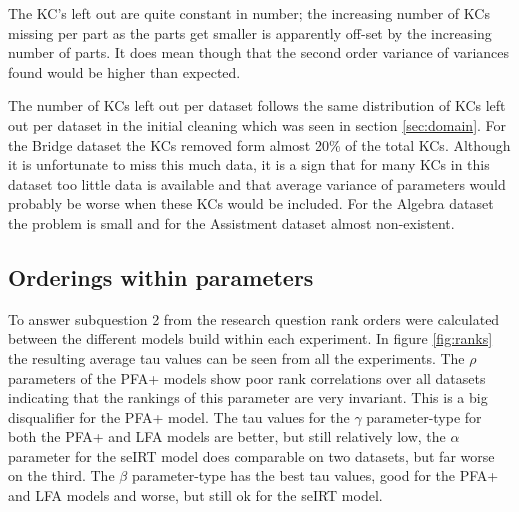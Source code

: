 \documentclass{scrartcl}
\begin{document}
The KC's left out are quite constant in number; the increasing number of KCs missing per part as the parts get smaller is apparently off-set by the increasing number of parts. It does mean though that the second order variance of variances found would be higher than expected.

The number of KCs left out per dataset follows the same distribution of KCs left out per dataset in the initial cleaning which was seen in section \ref{sec:domain}. For the Bridge dataset the KCs removed form almost 20\% of the total KCs. Although it is unfortunate to miss this much data, it is a sign that for many KCs in this dataset too little data is available and that average variance of parameters would probably be worse when these KCs would be included. For the Algebra dataset the problem is small and for the Assistment dataset almost non-existent.

\subsection{Orderings within parameters}
To answer subquestion 2 from the research question rank orders were calculated between the different models build within each experiment. In figure \ref{fig:ranks} the resulting average tau values can be seen from all the experiments. The $\rho$ parameters of the PFA+ models show poor rank correlations over all datasets indicating that the rankings of this parameter are very invariant. This is a big disqualifier for the PFA+ model.
The tau values for the $\gamma$ parameter-type for both the PFA+ and LFA models are better, but still relatively low, the $\alpha$ parameter for the seIRT model does comparable on two datasets, but far worse on the third.
The $\beta$ parameter-type has the best tau values, good for the PFA+ and LFA models and worse, but still ok for the seIRT model.
\end{document}
